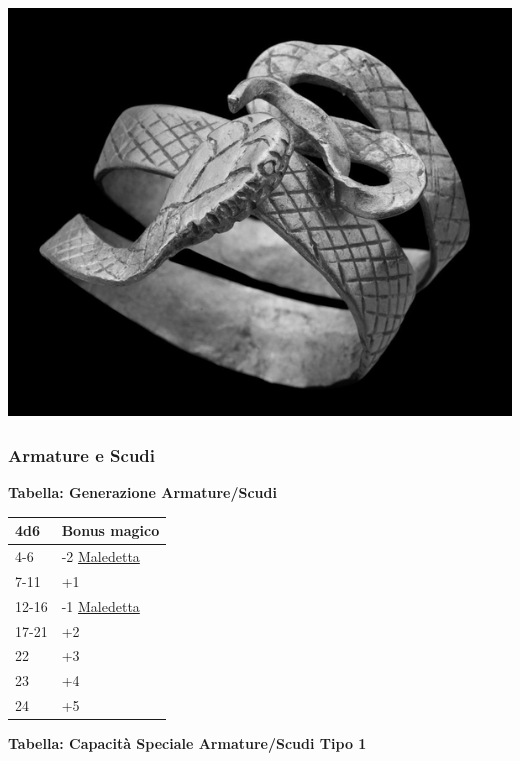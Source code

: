 \begin{multicols}{2}
{\begin{center}
\includegraphics[width=0.8\linewidth]{immagini/romanring.png}
\end{center}

\subsubsection{Armature e Scudi}

\textbf{Tabella: Generazione Armature/Scudi}\hypertarget{armatureescudi}{}\label{armatureescudi}

\medskip

{\small\begin{tabularx}{0.45\textwidth}{lX}
		\textbf{4d6} & \textbf{Bonus magico}\\
		\hline
		4-6 & -2 \hyperlink{Armatura maledetta}{Maledetta}\\
		7-11 &+1\\
		12-16 & -1 \hyperlink{Armatura maledetta}{Maledetta}\\
		17-21 & +2\\
		22 & +3\\
		23 & +4\\
		24 &+5\\
\end{tabularx}}

\medskip

\textbf{Tabella: Capacità Speciale Armature/Scudi Tipo 1}\hypertarget{Capacità Speciale Armature / Scudi Tipo 1}{}

\medskip

}
\end{multicols}
